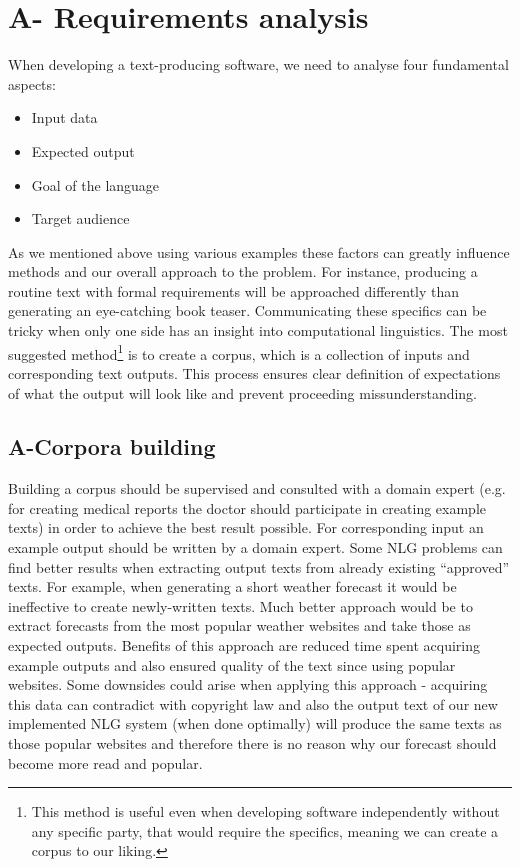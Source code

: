 \chapter{A- Requirements analysis}\label{chap:requirements}

When developing a text-producing software, we need to analyse four fundamental aspects:

\begin{itemize}
\item Input data
\item Expected output
\item Goal of the language 
\item Target audience  
\end{itemize}

As we mentioned above using various examples these factors can greatly influence methods and our overall approach to the problem. For instance, producing a routine text with formal requirements will be approached differently than generating an eye-catching book teaser. Communicating these specifics can be tricky when only one side has an insight into computational linguistics. The most suggested method\footnote{This method is useful even when developing software independently without any specific party, that would require the specifics, meaning we can create a corpus to our liking.} is to create a corpus, which is a collection of inputs and corresponding text outputs. This process ensures clear definition of expectations of what the output will look like and prevent proceeding missunderstanding. 

\section{A-Corpora building}
Building a corpus should be supervised and consulted with a domain expert (e.g. for creating medical reports the doctor should participate in creating example texts) in order to achieve the best result possible. For corresponding input an example output should be written by a domain expert. Some NLG problems can find better results when extracting output texts from already existing “approved” texts. For example, when generating a short weather forecast it would be ineffective to create newly-written texts. Much better approach would be to extract forecasts from the most popular weather websites and take those as expected outputs. Benefits of this approach are reduced time spent acquiring example outputs and also ensured quality of the text since using popular websites. Some downsides could arise when applying this approach - acquiring this data can contradict with copyright law and also the output text of our new implemented NLG system (when done optimally) will produce the same texts as those popular websites and therefore there is no reason why our forecast should become more read and popular.

